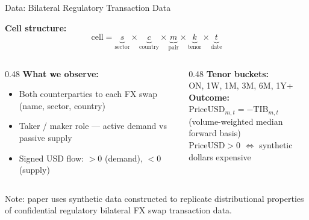\documentclass[aspectratio=169, 10pt]{beamer}
\begin{document}
\begin{frame}{Data: Bilateral Regulatory Transaction Data}

  \textbf{Cell structure:}
  \[
    \text{cell} = \underbrace{s}_{\text{sector}} \times
                  \underbrace{c}_{\text{country}} \times
                  \underbrace{m}_{\text{pair}} \times
                  \underbrace{k}_{\text{tenor}} \times
                  \underbrace{t}_{\text{date}}
  \]

  \bigskip

  \begin{columns}
    \begin{column}{0.48\textwidth}
      \textbf{What we observe:}
      \begin{itemize}
        \item Both counterparties to each FX swap (name, sector, country)
        \item Taker / maker role --- active demand vs passive supply
        \item Signed USD flow: $> 0$ (demand), $< 0$ (supply)
      \end{itemize}
    \end{column}
    \begin{column}{0.48\textwidth}
      \textbf{Tenor buckets:}\\[0.3em]
      ON, 1W, 1M, 3M, 6M, 1Y+\\[0.5em]
      \textbf{Outcome:}\\[0.3em]
      $\text{PriceUSD}_{m,t} = -\text{TIB}_{m,t}$\\
      {\color{dimgray}(volume-weighted median forward basis)}\\[0.5em]
      $\text{PriceUSD} > 0$ $\Leftrightarrow$ synthetic dollars expensive
    \end{column}
  \end{columns}

  \bigskip

  {\color{dimgray}\small
    Note: paper uses synthetic data constructed to replicate distributional properties
    of confidential regulatory bilateral FX swap transaction data.}

\end{frame}
\end{document}
